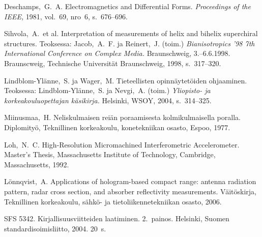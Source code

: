 \documentclass[english,12pt,a4paper,pdftex,elec,utf8]{aaltothesis}
\begin{document}
\begin{thebibliography}{99}
 Deschamps,\ G.\ A. Electromagnetics and
  Differential Forms. \textit{Proceedings of the IEEE,} 1981, vol.\
  69, nro~6, s.\ 676--696.

 Sihvola,\ A.\ et al.
  \foreignlanguage{english}{Interpretation of measurements of helix
    and bihelix superchiral structures.}
  Teoksessa: Jacob,\ A.\ F. ja
  Reinert,\ J. (toim.) \textit{Bianisotropics '98 7th International
    Conference on Complex Media.}  Braunschweig, 3.--6.6.1998.
  Braunscweig, Technische Universit\"at Braunschweig, 1998, s.\
  317--320.

\bibitem{Lindblom} Lindblom-Yl\"anne,\ S. ja Wager,\ M.  Tieteellisten
  opinn\"aytet\"oiden ohjaaminen. Teoksessa: Lindblom-Yl\"anne,\ S. ja
  Nevgi,\ A. (toim.) \textit{Yliopisto- ja korkeakouluopettajan
    k\"asikirja.}  Helsinki, WSOY, 2004, s.\ 314--325.

 Miinusmaa,\ H. Neliskulmaisen rei\"an poraamisesta
  kolmikulmaisella poralla. Diplomity\"o, Teknillinen korkeakoulu,
  konetekniikan osasto, Espoo, 1977.

\bibitem{Loh} Loh,\ N.\ C. High-Resolution Micromachined
  Interferometric Accelerometer. Master's Thesis, Massachusetts
  Institute of Technology, Cambridge,
  \foreignlanguage{english}{Massachusetts,} 1992.

 L\"onnqvist,\ A.
  \foreignlanguage{english}{Applications of hologram-based compact
    range: antenna radiation pattern, radar cross section, and
    absorber reflectivity measurements.}
  V\"ait\"oskirja, Teknillinen korkeakoulu, s\"ahk\"o- ja tietoliikennetekniikan
  osasto, 2006.

 SFS 5342. Kirjallisuusviitteiden laatiminen. 2.\ painos.
  Helsinki, Suomen standardisoimisliitto, 2004. 20~s.


\end{thebibliography}
\end{document}
